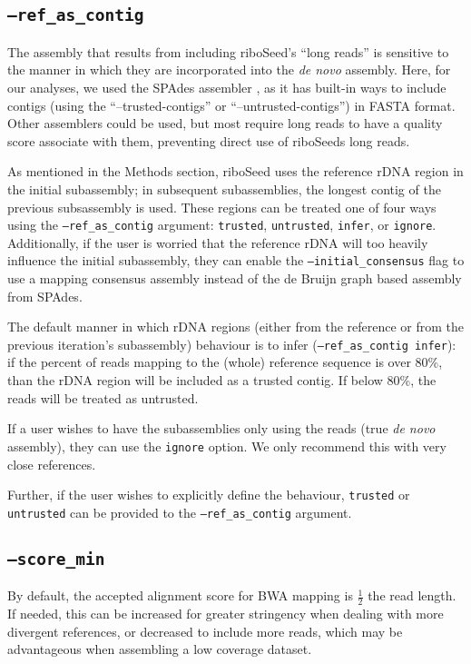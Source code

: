 \documentclass[10pt]{article}
\begin{document}
\subsection*{\texttt{--ref\_as\_contig}}
The assembly that results from including riboSeed's ``long reads'' is sensitive to the manner in which they are incorporated into the \textit{de novo} assembly. Here, for our analyses, we used the SPAdes assembler \cite{Bankevich2012}, as it has built-in ways to include contigs (using the ``--trusted-contigs'' or ``--untrusted-contigs'') in FASTA format.  Other assemblers could be used, but most require long reads to have a quality score associate with them, preventing direct use of riboSeeds long reads.

As mentioned in the Methods section, riboSeed uses the reference rDNA region in the initial subassembly;  in subsequent subassemblies, the longest contig of the previous subsassembly is used.  These regions can be treated one of four ways using the \texttt{--ref\_as\_contig} argument: \texttt{trusted}, \texttt{untrusted}, \texttt{infer}, or \texttt{ignore}.  Additionally, if the user is worried that the reference rDNA will too heavily influence the initial subassembly, they can enable the \texttt{--initial\_consensus} flag to use a mapping consensus assembly instead of the de Bruijn graph based assembly from SPAdes.

The default manner in which rDNA regions (either from the reference or from the previous iteration's subassembly) behaviour is to infer (\texttt{--ref\_as\_contig infer}): if the percent of reads mapping to  the (whole) reference sequence  is over 80\%, than the rDNA region will be included as a trusted contig.  If below 80\%, the reads will be treated as untrusted.

If a user wishes to have the subassemblies only using the reads (true \textit{de novo} assembly), they can use the \texttt{ignore} option.  We only recommend this with very close references.

Further, if the user wishes to explicitly define the behaviour, \texttt{trusted} or \texttt{untrusted} can be provided to the \texttt{--ref\_as\_contig} argument.

\subsection*{\texttt{--score\_min}}
By default, the accepted alignment score for BWA mapping is $\frac{1}{2}$ the read length.  If needed, this can be increased for greater stringency when dealing with more divergent references, or decreased to include more reads, which may be advantageous when assembling a low coverage dataset.
\end{document}
